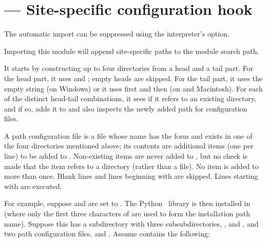 \section{ ---
         Site-specific configuration hook}



The automatic import can be suppressed using the interpreter's
 option.

Importing this module will append site-specific paths to the module
search path.

It starts by constructing up to four directories from a head and a
tail part.  For the head part, it uses  and
; empty heads are skipped.  For
the tail part, it uses the empty string (on Windows) or
it uses first  and then
 (on \UNIX and Macintosh).  For each of the distinct
head-tail combinations, it sees if it refers to an existing directory,
and if so, adds it to  and also inspects the newly added 
path for configuration files.

A path configuration file is a file whose name has the form
 and exists in one of the four directories
mentioned above; its contents are additional items (one
per line) to be added to .  Non-existing items are
never added to , but no check is made that the item
refers to a directory (rather than a file).  No item is added to
 more than once.  Blank lines and lines beginning with
\code{\#} are skipped.  Lines starting with  are executed.

For example, suppose  and  are
set to .  The Python \version\ library is then
installed in  (where only the
first three characters of  are used to form the
installation path name).  Suppose this has a subdirectory
 with three
subsubdirectories, ,  and , and two
path configuration files,  and .  Assume
 contains the following:

